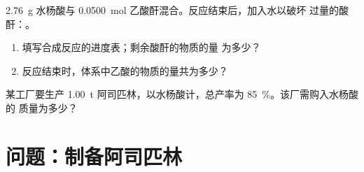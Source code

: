 \begin{exercise}[$\star\star\star$]\label{exo:g10:synthesis-yield:14}
\qty{2.76}{g} 水杨酸与 \qty{0.0500}{mol}
乙酸酐混合。反应结束后，加入水以破坏
过量的酸酐：。
\begin{enumerate}
  \item 填写合成反应的进度表；剩余酸酐的物质的量
        为多少？
  \item 反应结束时，体系中乙酸的物质的量共为多少？
\end{enumerate}
\end{exercise}

\begin{exercise}[$\star\star\star$]\label{exo:g10:synthesis-yield:15}
某工厂要生产 \qty{1.00}{t} 阿司匹林，以水杨酸计，总产率为
\qty{85}{\percent}。该厂需购入水杨酸的
质量为多少？
\end{exercise}

\section{问题：制备阿司匹林}

